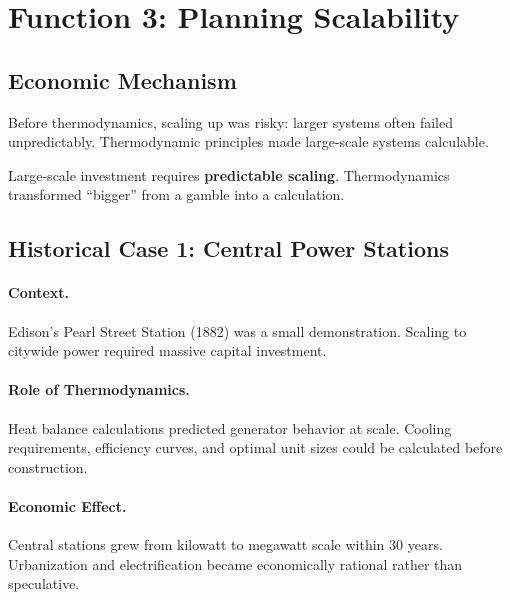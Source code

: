 \section{Function 3: Planning Scalability}
\label{sec:thermo-scaling}

\subsection{Economic Mechanism}

Before thermodynamics, scaling up was risky: larger systems often failed
unpredictably. Thermodynamic principles made large-scale systems calculable.

\begin{tcolorbox}[colback=yellow!5!white, colframe=yellow!75!black,
    title=Core Insight: Calculable Scale]
Large-scale investment requires \textbf{predictable scaling}. Thermodynamics
transformed ``bigger'' from a gamble into a calculation.
\end{tcolorbox}

\subsection{Historical Case 1: Central Power Stations}

\paragraph{Context.} Edison's Pearl Street Station (1882) was a small
demonstration. Scaling to citywide power required massive capital investment.

\paragraph{Role of Thermodynamics.} Heat balance calculations predicted
generator behavior at scale. Cooling requirements, efficiency curves, and
optimal unit sizes could be calculated before construction.

\paragraph{Economic Effect.} Central stations grew from kilowatt to megawatt
scale within 30 years. Urbanization and electrification became economically
rational rather than speculative.

